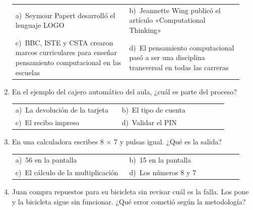 \documentclass[11pt,a4paper]{article}
\begin{document}
\begin{enumerate}[label=\textbf{\arabic*.},leftmargin=*,itemsep=6pt,topsep=0pt]
\begin{minipage}[t]{\linewidth}
\vspace{4pt}
\begin{tabular}{@{}>{\raggedright\arraybackslash}p{0.47\linewidth}>{\raggedright\arraybackslash}p{0.47\linewidth}@{}}
a)~Seymour Papert desarrolló el lenguaje LOGO & b)~Jeannette Wing publicó el artículo «Computational Thinking» \\
c)~BBC, ISTE y CSTA crearon marcos curriculares para enseñar pensamiento computacional en las escuelas & d)~El pensamiento computacional pasó a ser una disciplina transversal en todas las carreras \\
\end{tabular}
\end{minipage}

\item \begin{minipage}[t]{\linewidth}
En el ejemplo del cajero automático del aula, ¿cuál es parte del proceso?

\vspace{4pt}
\begin{tabular}{@{}>{\raggedright\arraybackslash}p{0.47\linewidth}>{\raggedright\arraybackslash}p{0.47\linewidth}@{}}
a)~La devolución de la tarjeta & b)~El tipo de cuenta \\
c)~El recibo impreso & d)~Validar el PIN \\
\end{tabular}
\end{minipage}

\item \begin{minipage}[t]{\linewidth}
En una calculadora escribes 8 $\times$ 7 y pulsas igual. ¿Qué es la salida?

\vspace{4pt}
\begin{tabular}{@{}>{\raggedright\arraybackslash}p{0.47\linewidth}>{\raggedright\arraybackslash}p{0.47\linewidth}@{}}
a)~56 en la pantalla & b)~15 en la pantalla \\
c)~El cálculo de la multiplicación & d)~Los números 8 y 7 \\
\end{tabular}
\end{minipage}

\item \begin{minipage}[t]{\linewidth}
Juan compra repuestos para su bicicleta sin revisar cuál es la falla. Los pone y la bicicleta sigue sin funcionar. ¿Qué error cometió según la metodología?


\end{minipage}
\end{enumerate}
\end{document}

